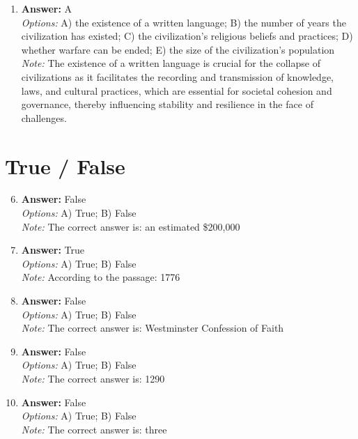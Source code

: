 \documentclass[12pt]{article}
\begin{document}
\begin{enumerate}[label=\arabic*.]
\\ \textit{Note:} The correct answer is monumental earthworks because the Hopewell culture is known for its extensive construction of large burial mounds and geometric earthworks, which served as significant ceremonial and social structures, despite lacking characteristics of a centralized state.
\item \textbf{Answer:} A
\\ \textit{Options:} A) the existence of a written language; B) the number of years the civilization has existed; C) the civilization's religious beliefs and practices; D) whether warfare can be ended; E) the size of the civilization's population
\\ \textit{Note:} The existence of a written language is crucial for the collapse of civilizations as it facilitates the recording and transmission of knowledge, laws, and cultural practices, which are essential for societal cohesion and governance, thereby influencing stability and resilience in the face of challenges.
\end{enumerate}

\section*{True / False}
\begin{enumerate}[label=\arabic*.]
\setcounter{enumi}{5}
\item \textbf{Answer:} False
\\ \textit{Options:} A) True; B) False
\\ \textit{Note:} The correct answer is: an estimated \$200,000
\item \textbf{Answer:} True
\\ \textit{Options:} A) True; B) False
\\ \textit{Note:} According to the passage: 1776
\item \textbf{Answer:} False
\\ \textit{Options:} A) True; B) False
\\ \textit{Note:} The correct answer is: Westminster Confession of Faith
\item \textbf{Answer:} False
\\ \textit{Options:} A) True; B) False
\\ \textit{Note:} The correct answer is: 1290
\item \textbf{Answer:} False
\\ \textit{Options:} A) True; B) False
\\ \textit{Note:} The correct answer is: three
\end{enumerate}
\end{document}
